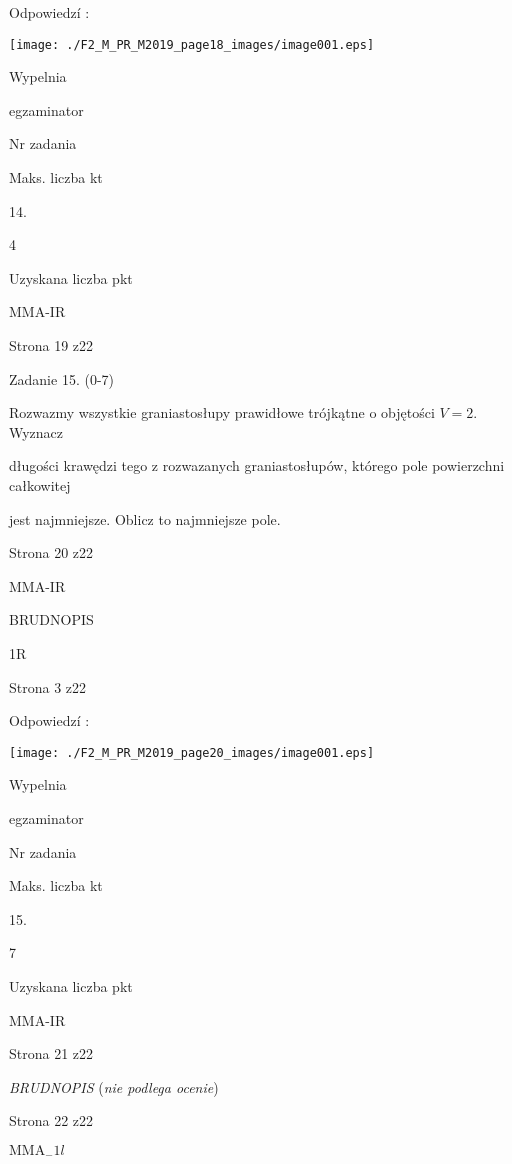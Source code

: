 \documentclass[a4paper,12pt]{article}
\begin{document}
Odpowiedzí :
\begin{center}
\texttt{[image: ./F2\_M\_PR\_M2019\_page18\_images/image001.eps]}
\end{center}
Wypelnia

egzaminator

Nr zadania

Maks. liczba kt

14.

4

Uzyskana liczba pkt

MMA-IR

Strona 19 z22





Zadanie 15. (0-7)

Rozwazmy wszystkie graniastosłupy prawidłowe trójkątne o objętości $V=2$. Wyznacz

długości krawędzi tego z rozwazanych graniastosłupów, którego pole powierzchni całkowitej

jest najmniejsze. Oblicz to najmniejsze pole.

Strona 20 z22

MMA-IR





BRUDNOPIS

1R

Strona 3 z22





Odpowiedzí :
\begin{center}
\texttt{[image: ./F2\_M\_PR\_M2019\_page20\_images/image001.eps]}
\end{center}
Wypelnia

egzaminator

Nr zadania

Maks. liczba kt

15.

7

Uzyskana liczba pkt

MMA-IR

Strona 21 z22





{\it BRUDNOPIS} ({\it nie podlega ocenie})

Strona 22 z22

$\mathrm{M}\mathrm{M}\mathrm{A}_{-}1l$
\end{document}
